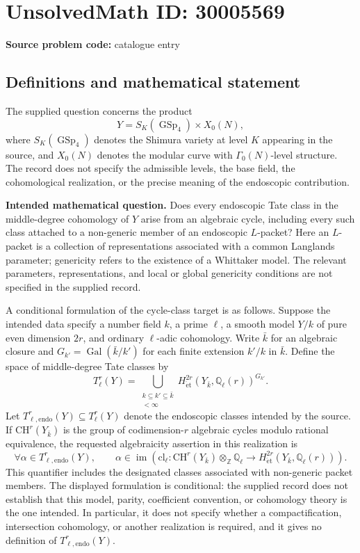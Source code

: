 \documentclass[11pt]{article}
\newcommand{\Z}{\mathbb{Z}}
\newcommand{\Q}{\mathbb{Q}}
\begin{document}
\section*{UnsolvedMath ID: 30005569}
\textbf{Source problem code:} catalogue entry
\subsection{Definitions and mathematical statement}
The supplied question concerns the product
\[
Y=S_K(\operatorname{GSp}_4)\times X_0(N),
\]
where \(S_K(\operatorname{GSp}_4)\) denotes the Shimura variety at level \(K\) appearing in the source, and \(X_0(N)\) denotes the modular curve with \(\Gamma_0(N)\)-level structure. The record does not specify the admissible levels, the base field, the cohomological realization, or the precise meaning of the endoscopic contribution.

\textbf{Intended mathematical question.} Does every endoscopic Tate class in the middle-degree cohomology of \(Y\) arise from an algebraic cycle, including every such class attached to a non-generic member of an endoscopic \(L\)-packet? Here an \(L\)-packet is a collection of representations associated with a common Langlands parameter; genericity refers to the existence of a Whittaker model. The relevant parameters, representations, and local or global genericity conditions are not specified in the supplied record.

A conditional formulation of the cycle-class target is as follows. Suppose the intended data specify a number field \(k\), a prime \(\ell\), a smooth model \(Y/k\) of pure even dimension \(2r\), and ordinary \(\ell\)-adic cohomology. Write \(\bar k\) for an algebraic closure and \(G_{k'}=\operatorname{Gal}(\bar k/k')\) for each finite extension \(k'/k\) in \(\bar k\). Define the space of middle-degree Tate classes by
\[
T^r_\ell(Y)=
\bigcup_{\substack{k\subseteq k'\subseteq\bar k\\[k':k]<\infty}}
H^{2r}_{\mathrm{\acute et}}(Y_{\bar k},\Q_\ell(r))^{G_{k'}}.
\]
Let \(T^r_{\ell,\mathrm{endo}}(Y)\subseteq T^r_\ell(Y)\) denote the endoscopic classes intended by the source. If \(\mathrm{CH}^r(Y_{\bar k})\) is the group of codimension-\(r\) algebraic cycles modulo rational equivalence, the requested algebraicity assertion in this realization is
\[
\forall\alpha\in T^r_{\ell,\mathrm{endo}}(Y),\qquad
\alpha\in\operatorname{im}\!\left(
\mathrm{cl}_\ell:\mathrm{CH}^r(Y_{\bar k})\otimes_{\Z}\Q_\ell
\longrightarrow H^{2r}_{\mathrm{\acute et}}(Y_{\bar k},\Q_\ell(r))
\right).
\]
This quantifier includes the designated classes associated with non-generic packet members. The displayed formulation is conditional: the supplied record does not establish that this model, parity, coefficient convention, or cohomology theory is the one intended. In particular, it does not specify whether a compactification, intersection cohomology, or another realization is required, and it gives no definition of \(T^r_{\ell,\mathrm{endo}}(Y)\).
\end{document}
